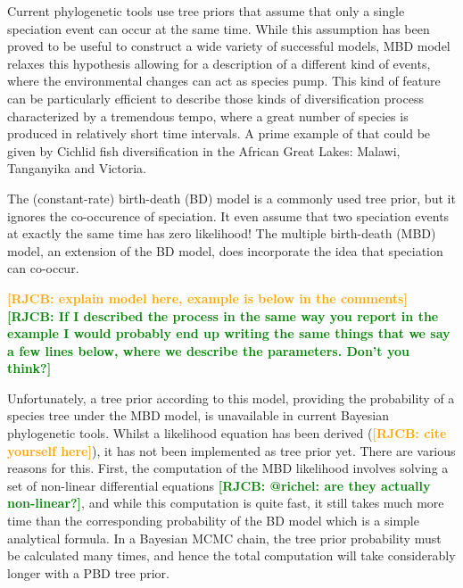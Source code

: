 \documentclass{article}
\newcommand*\richel[1]{\textcolor{orange}{\textbf{[RJCB: #1]}}}
\newcommand*\gio[1]{\textcolor{green}{\textbf{[RJCB: #1]}}}
\begin{document}
Current phylogenetic tools use tree priors that assume that only a single speciation event can occur at the same time.
While this assumption has been proved to be useful to construct a wide variety of successful models, MBD model relaxes this
hypothesis allowing for a description of a different kind of events, where the environmental changes can act as species pump.
This kind of feature can be particularly efficient to describe those kinds of diversification process 
characterized by a tremendous tempo, 
where a great number of species is produced in relatively short time intervals. 
A prime example of that could be given by Cichlid fish diversification in the African Great Lakes: Malawi, Tanganyika and Victoria.

The (constant-rate) birth-death (BD) model is a commonly 
used tree prior, but it ignores the co-occurence of speciation.
It even assume that two speciation events at exactly the same time
has zero likelihood!
The multiple birth-death (MBD) model, an extension of 
the BD model, does incorporate the idea that speciation can co-occur.

\richel{explain model here, example is below in the comments}
\gio{If I described the process in the same way you report in the example I would probably end up writing the same things that we say a few lines below, where we describe the parameters. Don't you think?}

Unfortunately, a tree prior according to this model, 
providing the probability of a species tree under the MBD model, 
is unavailable in current Bayesian phylogenetic tools. 
Whilst a likelihood equation has been derived (\richel{cite yourself here}),
it has not been implemented as tree prior yet. 
There are various reasons for this.
First, the computation of the MBD likelihood involves solving a set of 
non-linear differential equations \gio{@richel: are they actually non-linear?}, and while this computation is quite fast, 
it still takes much more time than the corresponding probability 
of the BD model which is a simple analytical formula. 
In a Bayesian MCMC chain, the tree prior probability must be calculated many times, 
and hence the total computation will take considerably longer with a PBD tree prior. 
\end{document}
